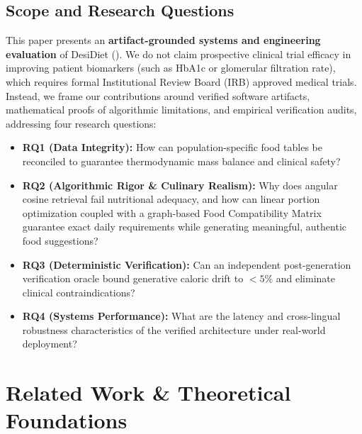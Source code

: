 \documentclass[5p,times,twocolumn]{elsarticle}
\makeatletter
\def\systemname{DesiDiet}%
\def\my@bx{bx}
\def\my@b{b}
\DeclareRobustCommand{\systemname}{%
  \texorpdfstring{%
    \ifx\f@series\my@bx
      DesiDiet%
    \else\ifx\f@series\my@b
      DesiDiet%
    \else
      \textsc{DesiDiet}%
    \fi\fi
  }{DesiDiet}%
}
\makeatother
\begin{document}
\subsection{Scope and Research Questions}
This paper presents an \textbf{artifact-grounded systems and engineering evaluation} of \systemname{} (). We do not claim prospective clinical trial efficacy in improving patient biomarkers (such as HbA1c or glomerular filtration rate), which requires formal Institutional Review Board (IRB) approved medical trials. Instead, we frame our contributions around verified software artifacts, mathematical proofs of algorithmic limitations, and empirical verification audits, addressing four research questions:
\begin{itemize}[leftmargin=*,itemsep=1.5pt]
  \item \textbf{RQ1 (Data Integrity):} How can population-specific food tables be reconciled to guarantee thermodynamic mass balance and clinical safety?
  \item \textbf{RQ2 (Algorithmic Rigor \& Culinary Realism):} Why does angular cosine retrieval fail nutritional adequacy, and how can linear portion optimization coupled with a graph-based Food Compatibility Matrix guarantee exact daily requirements while generating meaningful, authentic food suggestions?
  \item \textbf{RQ3 (Deterministic Verification):} Can an independent post-generation verification oracle bound generative caloric drift to $<5\%$ and eliminate clinical contraindications?
  \item \textbf{RQ4 (Systems Performance):} What are the latency and cross-lingual robustness characteristics of the verified architecture under real-world deployment?
\end{itemize}

\section{Related Work \& Theoretical Foundations}
\label{sec:related}
\end{document}
